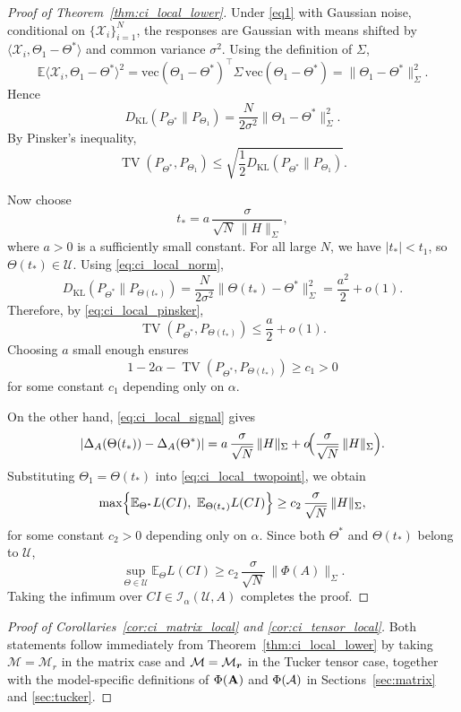 \documentclass[authoryear,preprint,review,12pt]{elsarticle}
\begin{document}
\begin{proof}[Proof of Theorem~\ref{thm:ci_local_lower}]
	Under \eqref{eq1} with Gaussian noise, conditional on $\{\mathcal X_i\}_{i=1}^N$, the responses are Gaussian with means shifted by $\langle\mathcal X_i,\Theta_1-\Theta^\ast\rangle$ and common variance $\sigma^2$.
	Using the definition of $\Sigma$,
	\[
	\mathbb E\langle\mathcal X_i,\Theta_1-\Theta^\ast\rangle^2
	=
	\mathrm{vec}(\Theta_1-\Theta^\ast)^\top
	\Sigma\,
	\mathrm{vec}(\Theta_1-\Theta^\ast)
	=
	\|\Theta_1-\Theta^\ast\|_\Sigma^2.
	\]
	Hence
	\[
	D_{\mathrm{KL}}(P_{\Theta^\ast}\|P_{\Theta_1})
	=
	\frac{N}{2\sigma^2}\|\Theta_1-\Theta^\ast\|_\Sigma^2.
	\]
	By Pinsker's inequality,
	\begin{equation}
		\operatorname{TV}(P_{\Theta^\ast},P_{\Theta_1})
		\le
		\sqrt{\frac12 D_{\mathrm{KL}}(P_{\Theta^\ast}\|P_{\Theta_1})}.
		\label{eq:ci_local_pinsker}
	\end{equation}
	
	Now choose
	\[
	t_\ast
	=
	a\,\frac{\sigma}{\sqrt N\,\|H\|_\Sigma},
	\]
	where $a>0$ is a sufficiently small constant.
	For all large $N$, we have $|t_\ast|<t_1$, so $\Theta(t_\ast)\in\mathcal U$.
	Using \eqref{eq:ci_local_norm},
	\[
	D_{\mathrm{KL}}(P_{\Theta^\ast}\|P_{\Theta(t_\ast)})
	=
	\frac{N}{2\sigma^2}\|\Theta(t_\ast)-\Theta^\ast\|_\Sigma^2
	=
	\frac{a^2}{2}+o(1).
	\]
	Therefore, by \eqref{eq:ci_local_pinsker},
	\[
	\operatorname{TV}(P_{\Theta^\ast},P_{\Theta(t_\ast)})
	\le
	\frac{a}{2}+o(1).
	\]
	Choosing $a$ small enough ensures
	\[
	1-2\alpha-\operatorname{TV}(P_{\Theta^\ast},P_{\Theta(t_\ast)})\ge c_1>0
	\]
	for some constant $c_1$ depending only on $\alpha$.
	
	On the other hand, \eqref{eq:ci_local_signal} gives
	\[
	|\Delta_A(\Theta(t_\ast))-\Delta_A(\Theta^\ast)|
	=
	a\,\frac{\sigma}{\sqrt N}\,\|H\|_\Sigma
	+
	o\!\Bigl(\frac{\sigma}{\sqrt N}\,\|H\|_\Sigma\Bigr).
	\]
	Substituting $\Theta_1=\Theta(t_\ast)$ into \eqref{eq:ci_local_twopoint}, we obtain
	\[
	\max\Bigl\{\mathbb E_{\Theta^\ast}L(CI),\ \mathbb E_{\Theta(t_\ast)}L(CI)\Bigr\}
	\ge
	c_2\,\frac{\sigma}{\sqrt N}\,\|H\|_\Sigma,
	\]
	for some constant $c_2>0$ depending only on $\alpha$.
	Since both $\Theta^\ast$ and $\Theta(t_\ast)$ belong to $\mathcal U$,
	\[
	\sup_{\Theta\in\mathcal U}\mathbb E_\Theta L(CI)
	\ge
	c_2\,\frac{\sigma}{\sqrt N}\,\|\Phi(A)\|_\Sigma.
	\]
	Taking the infimum over $CI\in\mathcal I_\alpha(\mathcal U,A)$ completes the proof.
\end{proof}

\begin{proof}[Proof of Corollaries~\ref{cor:ci_matrix_local} and \ref{cor:ci_tensor_local}]
	Both statements follow immediately from Theorem~\ref{thm:ci_local_lower} by taking $\mathcal M=\mathcal M_r$ in the matrix case and $\mathcal M=\mathcal M_{\boldsymbol r}$ in the Tucker tensor case, together with the model-specific definitions of $\Phi(\mathbf{A})$ and $\Phi(\mathcal{A})$ in Sections~\ref{sec:matrix} and \ref{sec:tucker}.
\end{proof}




% 

\end{document}
